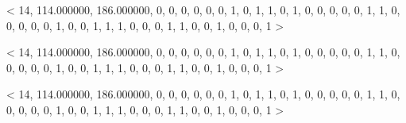 < 14, 114.000000, 186.000000, 0, 0, 0, 0, 0, 0, 1, 0, 1, 1, 0, 1, 0, 0, 0, 0, 0, 1, 1, 0, 0, 0, 0, 0, 1, 0, 0, 1, 1, 1, 0, 0, 0, 1, 1, 0, 0, 1, 0, 0, 0, 1 > 

< 14, 114.000000, 186.000000, 0, 0, 0, 0, 0, 0, 1, 0, 1, 1, 0, 1, 0, 0, 0, 0, 0, 1, 1, 0, 0, 0, 0, 0, 1, 0, 0, 1, 1, 1, 0, 0, 0, 1, 1, 0, 0, 1, 0, 0, 0, 1 > 

< 14, 114.000000, 186.000000, 0, 0, 0, 0, 0, 0, 1, 0, 1, 1, 0, 1, 0, 0, 0, 0, 0, 1, 1, 0, 0, 0, 0, 0, 1, 0, 0, 1, 1, 1, 0, 0, 0, 1, 1, 0, 0, 1, 0, 0, 0, 1 > 